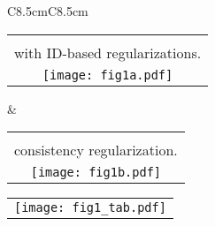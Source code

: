 \documentclass[journal]{IEEEtran}
\begin{document}
\begin{figure*}[!t]

\begin{center}
    \centering
    \footnotesize
     \begin{tabular}{C{8.5cm}C{8.5cm}}
     \begin{tabular}{c}
     \shortstack[l]{\textbf{(a)} Existing domain translation-based UDA methods  \cite{deng2018image,wei2018person,deng2018similarity,chen2019instance,tang2020cgan} \\ with ID-based regularizations.} \vspace{5pt} \\
     \texttt{[image: fig1a.pdf]}
     \end{tabular} &
     \begin{tabular}{c}
     \shortstack[l]{\textbf{(b)} Our proposed structured domain translation with a relation-\\consistency  regularization.}  \vspace{5pt} \\
     \texttt{[image: fig1b.pdf]}
     \end{tabular}
\end{tabular}

    \begin{tabular}{c@{}}
   \texttt{[image: fig1\_tab.pdf]} \\
    \end{tabular}   \vspace{8pt} \\


\end{center}
\end{figure*}
\end{document}
